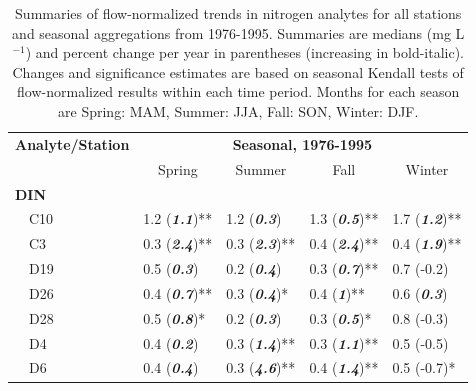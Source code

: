 \documentclass[journal = esthag, manuscript = article]{achemso}\usepackage[]{graphicx}\usepackage[]{color}
\begin{document}
\begin{suppinfo}
\begin{table}[!tbp]
\caption{Summaries of flow-normalized trends in nitrogen analytes for all stations and seasonal aggregations from 1976-1995. Summaries are  medians (mg L$^{-1}$) and percent change per year in parentheses (increasing in bold-italic). Changes and significance estimates are based on seasonal Kendall tests of flow-normalized results within each time period. Months for each season are Spring: MAM, Summer: JJA, Fall: SON, Winter: DJF.\label{tab:trndsbef}} 
\begin{center}
\begin{tabular}{lllll}
\hline\hline
\multicolumn{1}{l}{\bfseries Analyte/Station}&\multicolumn{4}{c}{\bfseries Seasonal, 1976-1995}\tabularnewline
\cline{2-5}
\multicolumn{1}{l}{}&\multicolumn{1}{c}{Spring}&\multicolumn{1}{c}{Summer}&\multicolumn{1}{c}{Fall}&\multicolumn{1}{c}{Winter}\tabularnewline
\hline
{\bfseries DIN}&&&&\tabularnewline
~~C10&1.2 \footnotesize{(\textit{\textbf{1.1}})**}&1.2 \footnotesize{(\textit{\textbf{0.3}})}&1.3 \footnotesize{(\textit{\textbf{0.5}})**}&1.7 \footnotesize{(\textit{\textbf{1.2}})**}\tabularnewline
~~C3&0.3 \footnotesize{(\textit{\textbf{2.4}})**}&0.3 \footnotesize{(\textit{\textbf{2.3}})**}&0.4 \footnotesize{(\textit{\textbf{2.4}})**}&0.4 \footnotesize{(\textit{\textbf{1.9}})**}\tabularnewline
~~D19&0.5 \footnotesize{(\textit{\textbf{0.3}})}&0.2 \footnotesize{(\textit{\textbf{0.4}})}&0.3 \footnotesize{(\textit{\textbf{0.7}})**}&0.7 \footnotesize{(-0.2)}\tabularnewline
~~D26&0.4 \footnotesize{(\textit{\textbf{0.7}})**}&0.3 \footnotesize{(\textit{\textbf{0.4}})*}&0.4 \footnotesize{(\textit{\textbf{1}})**}&0.6 \footnotesize{(\textit{\textbf{0.3}})}\tabularnewline
~~D28&0.5 \footnotesize{(\textit{\textbf{0.8}})*}&0.2 \footnotesize{(\textit{\textbf{0.3}})}&0.3 \footnotesize{(\textit{\textbf{0.5}})*}&0.8 \footnotesize{(-0.3)}\tabularnewline
~~D4&0.4 \footnotesize{(\textit{\textbf{0.2}})}&0.3 \footnotesize{(\textit{\textbf{1.4}})**}&0.3 \footnotesize{(\textit{\textbf{1.1}})**}&0.5 \footnotesize{(-0.5)}\tabularnewline
~~D6&0.4 \footnotesize{(\textit{\textbf{0.4}})}&0.3 \footnotesize{(\textit{\textbf{4.6}})**}&0.4 \footnotesize{(\textit{\textbf{1.4}})**}&0.5 \footnotesize{(-0.7)*}\tabularnewline

\end{tabular}
\end{center}
\end{table}
\end{suppinfo}
\end{document}
